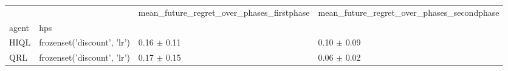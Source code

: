 \begin{tabular}{llll}
\toprule
 &  & mean_future_regret_over_phases_firstphase & mean_future_regret_over_phases_secondphase \\
agent & hps &  &  \\
\midrule
HIQL & frozenset({'discount', 'lr'}) & 0.16 $\pm$ 0.11 & 0.10 $\pm$ 0.09 \\
\cline{1-4}
QRL & frozenset({'discount', 'lr'}) & 0.17 $\pm$ 0.15 & 0.06 $\pm$ 0.02 \\
\cline{1-4}
\bottomrule
\end{tabular}
